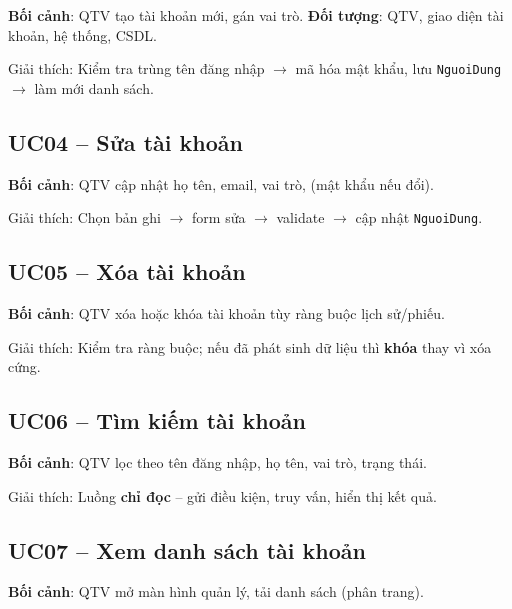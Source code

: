 \textbf{Bối cảnh}: QTV tạo tài khoản mới, gán vai trò. \textbf{Đối tượng}: QTV, giao diện tài khoản, hệ thống, CSDL.



Giải thích: Kiểm tra trùng tên đăng nhập $\rightarrow$ mã hóa mật khẩu, lưu \texttt{NguoiDung} $\rightarrow$ làm mới danh sách.

\subsection{UC04 -- Sửa tài khoản}

\textbf{Bối cảnh}: QTV cập nhật họ tên, email, vai trò, (mật khẩu nếu đổi).



Giải thích: Chọn bản ghi $\rightarrow$ form sửa $\rightarrow$ validate $\rightarrow$ cập nhật \texttt{NguoiDung}.

\subsection{UC05 -- Xóa tài khoản}

\textbf{Bối cảnh}: QTV xóa hoặc khóa tài khoản tùy ràng buộc lịch sử/phiếu.



Giải thích: Kiểm tra ràng buộc; nếu đã phát sinh dữ liệu thì \textbf{khóa} thay vì xóa cứng.

\subsection{UC06 -- Tìm kiếm tài khoản}

\textbf{Bối cảnh}: QTV lọc theo tên đăng nhập, họ tên, vai trò, trạng thái.



Giải thích: Luồng \textbf{chỉ đọc} -- gửi điều kiện, truy vấn, hiển thị kết quả.

\subsection{UC07 -- Xem danh sách tài khoản}

\textbf{Bối cảnh}: QTV mở màn hình quản lý, tải danh sách (phân trang).



